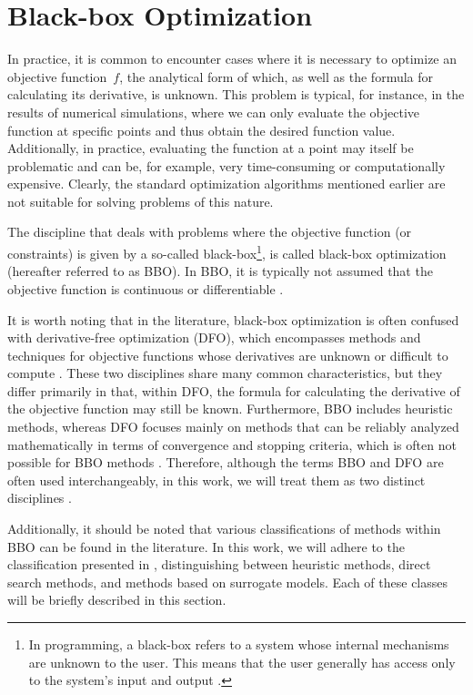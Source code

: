 \section{Black-box Optimization}\label{black-box}
In practice, it is common to encounter cases where it is necessary to optimize an objective function~$f$, the analytical form of which, as well as the formula for calculating its derivative, is unknown. This problem is typical, for instance, in the results of numerical simulations, where we can only evaluate the objective function at specific points and thus obtain the desired function value. Additionally, in practice, evaluating the function at a point may itself be problematic and can be, for example, very time-consuming or computationally expensive. Clearly, the standard optimization algorithms mentioned earlier are not suitable for solving problems of this nature.

The discipline that deals with problems where the objective function (or constraints) is given by a so-called black-box\footnote{In programming, a black-box refers to a system whose internal mechanisms are unknown to the user. This means that the user generally has access only to the system’s input and output \cite{BBO-textbook}.}, is called black-box optimization (hereafter referred to as BBO). In BBO, it is typically not assumed that the objective function is continuous or differentiable \cite{BBO-textbook, derivative-free-review, two-decades}.

It is worth noting that in the literature, black-box optimization is often confused with derivative-free optimization (DFO), which encompasses methods and techniques for objective functions whose derivatives are unknown or difficult to compute \cite{BBO-textbook, derivative-free-review, Kramer2011}. These two disciplines share many common characteristics, but they differ primarily in that, within DFO, the formula for calculating the derivative of the objective function may still be known. Furthermore, BBO includes heuristic methods, whereas DFO focuses mainly on methods that can be reliably analyzed mathematically in terms of convergence and stopping criteria, which is often not possible for BBO methods \cite{BBO-textbook}. Therefore, although the terms BBO and DFO are often used interchangeably, in this work, we will treat them as two distinct disciplines \cite{BBO-textbook}.

Additionally, it should be noted that various classifications of methods within BBO can be found in the literature. In this work, we will adhere to the classification presented in \cite{BBO-textbook}, distinguishing between heuristic methods, direct search methods, and methods based on surrogate models. Each of these classes will be briefly described in this section.




